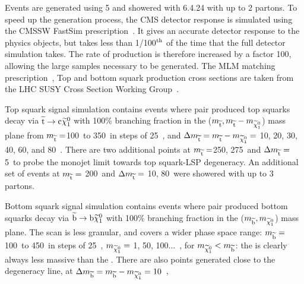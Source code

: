 Events are generated using \MADGRAPH{}5 and showered with \PYTHIA{}6.4.24 with up to 2 partons. To speed up the generation process, the CMS detector response is simulated using the CMSSW FastSim prescription~\cite{FASTSIM}. 
It gives an accurate detector response to the physics objects, but takes less than 1/100$^{\rm th}$ of the time that the full \GEANTfour detector simulation takes. 
The rate of production is therefore increased by a factor 100, allowing the large samples necessary to be generated.
The MLM matching prescription~\cite{MLMmatching}, 
Top and bottom squark production cross sections are taken from the LHC SUSY Cross Section Working Group~\cite{bib:SUSYxs}.

Top squark signal simulation 
contains events where pair produced top squarks decay via $\widetilde{{\rm t}}\rightarrow{\rm c}\widetilde{\chi}^{0}_{1}$ with 100\% branching fraction
in the ($m_{\widetilde{{\rm t}}}, m_{\widetilde{{\rm t}}} - m_{\widetilde{\chi}^{0}_{1}}$) mass plane from $m_{\widetilde{{\rm t}}} =$100~\GeV to 350~\GeV in steps of 25~\GeV, and 
$\Delta m_{\widetilde{{\rm t}}} = m_{\widetilde{{\rm t}}} - m_{\widetilde{\chi}^{0}_{1}} = $ 10, 20, 30, 40, 60, and 80~\GeV. 
There are two additional points at  $m_{\widetilde{{\rm t}}} =$250, 275~\GeV and $\Delta m_{\widetilde{{\rm t}}} = $ 5~\GeV to probe the monojet limit towards top squark-LSP degeneracy.
An additional set of events at $m_{\widetilde{{\rm t}}} =$ 200~\GeV and $\Delta m_{\widetilde{{\rm t}}} =$ 10, 80~\GeV were showered with up to 3 partons.



Bottom squark signal simulation 
contains events where pair produced bottom squarks decay via $\widetilde{{\rm b}}\rightarrow{\rm b}\widetilde{\chi}^{0}_{1}$ with 100\% branching fraction
in the ($m_{\widetilde{{\rm b}}}, m_{\widetilde{\chi}^{0}_{1}}$) mass plane.
The scan is less granular, and covers a wider phase space range: 
$m_{\widetilde{{\rm b}}} =$100~\GeV to 450~\GeV in steps of 25~\GeV, 
$m_{\widetilde{\chi}^{0}_{1}} = $ 1, 50, 100...~\GeV,  for $m_{\widetilde{\chi}^{0}_{1}} < m_{\widetilde{{\rm b}}}$: the \chiOneZero is clearly always less massive than the \sBot. 
There are also points generated close to the degeneracy line, at 
$\Delta m_{\widetilde{{\rm b}}} = m_{\widetilde{{\rm b}}} - m_{\widetilde{\chi}^{0}_{1}} = 10$~\GeV, 



